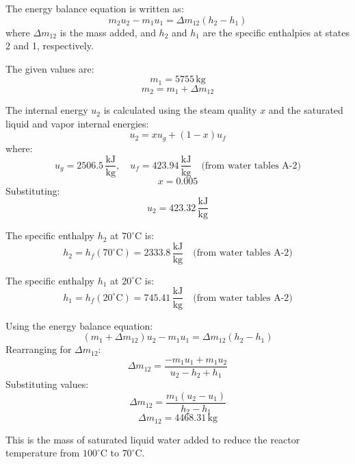 The energy balance equation is written as:  
\[
m_2 u_2 - m_1 u_1 = \Delta m_{12} (h_2 - h_1)
\]  
where \( \Delta m_{12} \) is the mass added, and \( h_2 \) and \( h_1 \) are the specific enthalpies at states 2 and 1, respectively.  

The given values are:  
\[
m_1 = 5755 \, \text{kg}
\]  
\[
m_2 = m_1 + \Delta m_{12}
\]  

The internal energy \( u_2 \) is calculated using the steam quality \( x \) and the saturated liquid and vapor internal energies:  
\[
u_2 = x u_g + (1 - x) u_f
\]  
where:  
\[
u_g = 2506.5 \, \frac{\text{kJ}}{\text{kg}}, \quad u_f = 423.94 \, \frac{\text{kJ}}{\text{kg}} \quad \text{(from water tables A-2)}
\]  
\[
x = 0.005
\]  
Substituting:  
\[
u_2 = 423.32 \, \frac{\text{kJ}}{\text{kg}}
\]  

The specific enthalpy \( h_2 \) at \( 70^\circ\text{C} \) is:  
\[
h_2 = h_f(70^\circ\text{C}) = 2333.8 \, \frac{\text{kJ}}{\text{kg}} \quad \text{(from water tables A-2)}
\]  

The specific enthalpy \( h_1 \) at \( 20^\circ\text{C} \) is:  
\[
h_1 = h_f(20^\circ\text{C}) = 745.41 \, \frac{\text{kJ}}{\text{kg}} \quad \text{(from water tables A-2)}
\]  

Using the energy balance equation:  
\[
(m_1 + \Delta m_{12}) u_2 - m_1 u_1 = \Delta m_{12} (h_2 - h_1)
\]  
Rearranging for \( \Delta m_{12} \):  
\[
\Delta m_{12} = \frac{-m_1 u_1 + m_1 u_2}{u_2 - h_2 + h_1}
\]  
Substituting values:  
\[
\Delta m_{12} = \frac{m_1 (u_2 - u_1)}{h_2 - h_1}
\]  
\[
\Delta m_{12} = 4468.31 \, \text{kg}
\]  

This is the mass of saturated liquid water added to reduce the reactor temperature from \( 100^\circ\text{C} \) to \( 70^\circ\text{C} \).